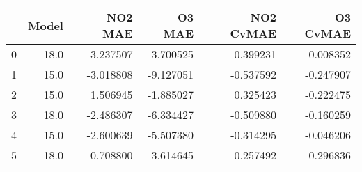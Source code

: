 \begin{tabular}{lrrrrr}
\toprule
{} &  Model &   NO2 MAE &    O3 MAE &  NO2 CvMAE &  O3 CvMAE \\
\midrule
0 &   18.0 & -3.237507 & -3.700525 &  -0.399231 & -0.008352 \\
1 &   15.0 & -3.018808 & -9.127051 &  -0.537592 & -0.247907 \\
2 &   15.0 &  1.506945 & -1.885027 &   0.325423 & -0.222475 \\
3 &   18.0 & -2.486307 & -6.334427 &  -0.509880 & -0.160259 \\
4 &   15.0 & -2.600639 & -5.507380 &  -0.314295 & -0.046206 \\
5 &   18.0 &  0.708800 & -3.614645 &   0.257492 & -0.296836 \\
\bottomrule
\end{tabular}
